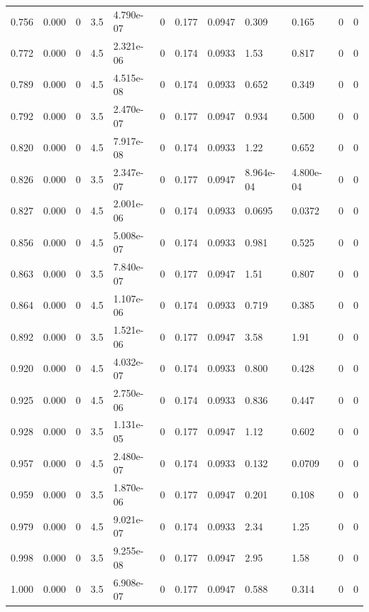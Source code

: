 \documentclass[preview]{standalone}
\begin{document}
{{{\begin{tabular}{L{1.2cm}C{1.2cm} C{0.3cm}C{0.5cm} C{1.4cm}C{1.4cm} C{1.4cm}C{1.4cm} C{1.6cm}C{1.6cm} C{1.6cm}C{1.6cm}}
  0.756  &  0.000  & 0     & 3.5 &  4.790e-07  & 0  &  0.177&   0.0947& 0.309 & 0.165   &  0 & 0  \\ 
  0.772  &  0.000  & 0     & 4.5 &  2.321e-06  & 0  &  0.174&   0.0933& 1.53 & 0.817   &  0 & 0  \\ 
  0.789  &  0.000  & 0     & 4.5 &  4.515e-08  & 0  &  0.174&   0.0933& 0.652 & 0.349   &  0 & 0  \\ 
  0.792  &  0.000  & 0     & 3.5 &  2.470e-07  & 0  &  0.177&   0.0947& 0.934 & 0.500   &  0 & 0  \\ 
  0.820  &  0.000  & 0     & 4.5 &  7.917e-08  & 0  &  0.174&   0.0933& 1.22 & 0.652   &  0 & 0  \\ 
  0.826  &  0.000  & 0     & 3.5 &  2.347e-07  & 0  &  0.177&   0.0947& 8.964e-04 & 4.800e-04   &  0 & 0  \\ 
  0.827  &  0.000  & 0     & 4.5 &  2.001e-06  & 0  &  0.174&   0.0933& 0.0695 & 0.0372   &  0 & 0  \\ 
  0.856  &  0.000  & 0     & 4.5 &  5.008e-07  & 0  &  0.174&   0.0933& 0.981 & 0.525   &  0 & 0  \\ 
  0.863  &  0.000  & 0     & 3.5 &  7.840e-07  & 0  &  0.177&   0.0947& 1.51 & 0.807   &  0 & 0  \\ 
  0.864  &  0.000  & 0     & 4.5 &  1.107e-06  & 0  &  0.174&   0.0933& 0.719 & 0.385   &  0 & 0  \\ 
  0.892  &  0.000  & 0     & 3.5 &  1.521e-06  & 0  &  0.177&   0.0947& 3.58 & 1.91   &  0 & 0  \\ 
  0.920  &  0.000  & 0     & 4.5 &  4.032e-07  & 0  &  0.174&   0.0933& 0.800 & 0.428   &  0 & 0  \\ 
  0.925  &  0.000  & 0     & 4.5 &  2.750e-06  & 0  &  0.174&   0.0933& 0.836 & 0.447   &  0 & 0  \\ 
  0.928  &  0.000  & 0     & 3.5 &  1.131e-05  & 0  &  0.177&   0.0947& 1.12 & 0.602   &  0 & 0  \\ 
  0.957  &  0.000  & 0     & 4.5 &  2.480e-07  & 0  &  0.174&   0.0933& 0.132 & 0.0709   &  0 & 0  \\ 
  0.959  &  0.000  & 0     & 3.5 &  1.870e-06  & 0  &  0.177&   0.0947& 0.201 & 0.108   &  0 & 0  \\ 
  0.979  &  0.000  & 0     & 4.5 &  9.021e-07  & 0  &  0.174&   0.0933& 2.34 & 1.25   &  0 & 0  \\ 
  0.998  &  0.000  & 0     & 3.5 &  9.255e-08  & 0  &  0.177&   0.0947& 2.95 & 1.58   &  0 & 0  \\ 
  1.000  &  0.000  & 0     & 3.5 &  6.908e-07  & 0  &  0.177&   0.0947& 0.588 & 0.314   &  0 & 0  \\ 

\end{tabular}}}}
\end{document}
